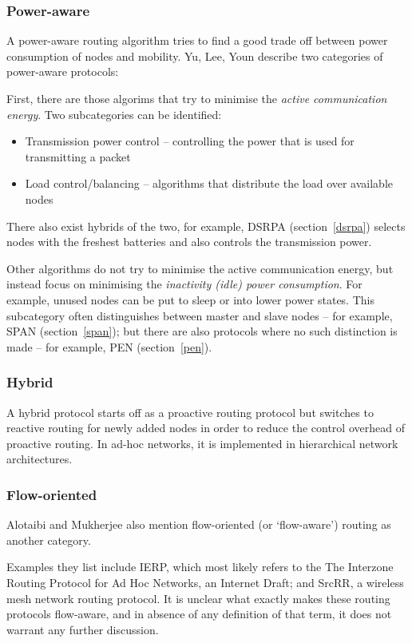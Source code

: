 \subsubsection*{Power-aware}
A power-aware routing algorithm tries to find a good trade off between
power consumption of nodes and mobility. Yu, Lee, Youn\cite{main1} describe two categories
of power-aware protocols:

First, there are those algorims that try to minimise the \textit{active communication energy}. Two
subcategories can be identified:
\begin{itemize}
    \item Transmission power control -- controlling the power that is used for transmitting a packet
    \item Load control/balancing -- algorithms that distribute the load over available nodes
\end{itemize}
There also exist hybrids of the two, for example, DSRPA (section~\ref{dsrpa})
selects nodes with the freshest batteries and also controls the transmission
power.

Other algorithms do not try to minimise the active communication energy, but
instead focus on minimising the  \textit{inactivity (idle) power consumption}. For example, unused
nodes can be put to sleep or into lower power states. This subcategory often
distinguishes between master and slave nodes -- for example, SPAN (section~\ref{span}); but there are also protocols
where no such distinction is made -- for example, PEN (section~\ref{pen}).

\subsubsection*{Hybrid}
A hybrid protocol starts off as a proactive routing protocol but switches
to reactive routing for newly added nodes in order to reduce the control
overhead of proactive routing. In ad-hoc networks, it is implemented in
hierarchical network architectures.

\subsubsection*{Flow-oriented}
Alotaibi and Mukherjee\cite{alotaibi2012survey} also mention flow-oriented (or `flow-aware')
routing as another category.

Examples they list include
IERP, which most likely refers to the The Interzone Routing Protocol for Ad Hoc Networks, an Internet Draft\cite{manet-zone-ierp-02};
and SrcRR\cite{aguayo2005srcrr}, a wireless mesh network routing protocol. It is unclear what exactly
makes these routing protocols flow-aware, and in absence of any definition of
that term, it does not warrant any further discussion. 

